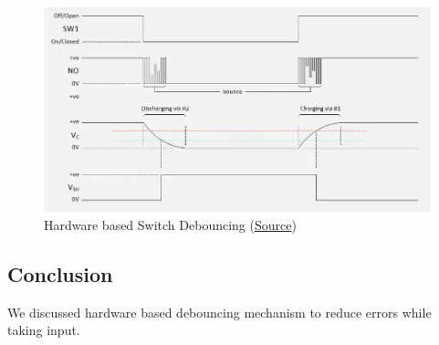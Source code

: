 \documentclass[a4paper]{article} %
\begin{document}
        \begin{figure}[h!]
            \centering
            \includegraphics[width=\textwidth]{Assignment 5/2_hardware debouncing/graph.png}
            \caption{Hardware based Switch Debouncing (\href{https://www.digikey.com/en/articles/how-to-implement-hardware-debounce-for-switches-and-relays}{Source})}
            \label{fg14}
        \end{figure}

    \subsection{Conclusion}
        We discussed hardware based debouncing mechanism to reduce errors while taking input.
\newpage
\end{document}
